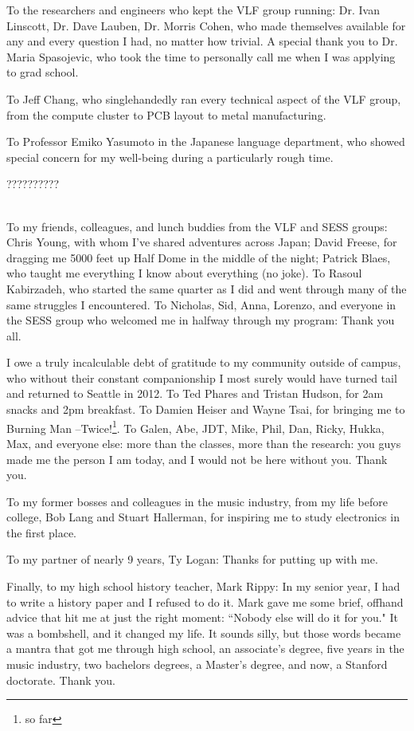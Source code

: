 To the researchers and engineers who kept the VLF group running: Dr. Ivan Linscott, Dr. Dave Lauben, Dr. Morris Cohen, who made themselves available for any and every question I had, no matter how trivial. A special thank you to Dr. Maria Spasojevic, who took the time to personally call me when I was applying to grad school.
 
To Jeff Chang, who singlehandedly ran every technical aspect of the VLF group, from the compute cluster to PCB layout to metal manufacturing.
 
To Professor Emiko Yasumoto in the Japanese language department, who showed special concern for my well-being during a particularly rough time. \begin{CJK}{UTF8}{min}??????????\end{CJK} \\

To my friends, colleagues, and lunch buddies from the VLF and SESS groups: Chris Young, with whom I've shared adventures across Japan; David Freese, for dragging me 5000 feet up Half Dome in the middle of the night; Patrick Blaes, who taught me everything I know about everything (no joke). To Rasoul Kabirzadeh, who started the same quarter as I did and went through many of the same struggles I encountered. To Nicholas, Sid, Anna, Lorenzo, and everyone in the SESS group who welcomed me in halfway through my program: Thank you all.

I owe a truly incalculable debt of gratitude to my community outside of campus, who without their constant companionship I most surely would have turned tail and returned to Seattle in 2012. To Ted Phares and Tristan Hudson, for 2am snacks and 2pm breakfast. To Damien Heiser and Wayne Tsai, for bringing me to Burning Man --Twice!\footnote{so far}. To Galen, Abe, JDT, Mike, Phil, Dan, Ricky, Hukka, Max, and everyone else: more than the classes, more than the research: you guys made me the person I am today, and I would not be here without you. Thank you.

To my former bosses and colleagues in the music industry, from my life before college, Bob Lang and Stuart Hallerman, for inspiring me to study electronics in the first place.

To my partner of nearly 9 years, Ty Logan: Thanks for putting up with me.

Finally, to my high school history teacher, Mark Rippy: In my senior year, I had to write a history paper and I refused to do it. Mark gave me some brief, offhand advice that hit me at just the right moment: ``Nobody else will do it for you." It was a bombshell, and it changed my life. It sounds silly, but those words became a mantra that got me through high school, an associate's degree, five years in the music industry, two bachelors degrees, a Master's degree, and now, a Stanford doctorate. Thank you.

